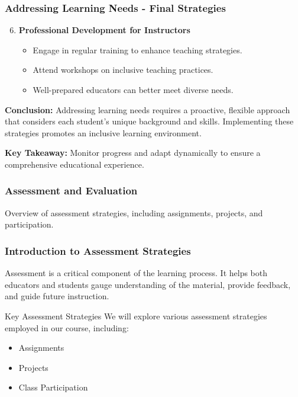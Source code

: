 \documentclass[aspectratio=169]{beamer}
\begin{document}
\begin{frame}[fragile]
    \frametitle{Addressing Learning Needs - Final Strategies}
    \begin{enumerate}
        \setcounter{enumi}{5} %
        \item \textbf{Professional Development for Instructors}
            \begin{itemize}
                \item Engage in regular training to enhance teaching strategies.
                \item Attend workshops on inclusive teaching practices.
                \item Well-prepared educators can better meet diverse needs.
            \end{itemize}
    \end{enumerate}
    
    \textbf{Conclusion:} Addressing learning needs requires a proactive, flexible approach that considers each student's unique background and skills. Implementing these strategies promotes an inclusive learning environment.
    
    \textbf{Key Takeaway:} Monitor progress and adapt dynamically to ensure a comprehensive educational experience.
\end{frame}

\begin{frame}[fragile]
    \frametitle{Assessment and Evaluation}
    Overview of assessment strategies, including assignments, projects, and participation.
\end{frame}

\begin{frame}[fragile]
    \frametitle{Introduction to Assessment Strategies}
    Assessment is a critical component of the learning process. It helps both educators and students gauge understanding of the material, provide feedback, and guide future instruction. 
    \begin{block}{Key Assessment Strategies}
        We will explore various assessment strategies employed in our course, including:
        \begin{itemize}
            \item Assignments
            \item Projects
            \item Class Participation
        \end{itemize}
    \end{block}
\end{frame}
\end{document}
